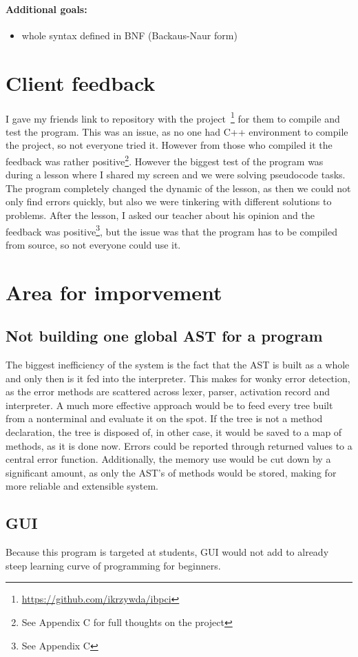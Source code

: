 \documentclass[12pt]{article}
\begin{document}
    \paragraph{Additional goals:}
    \begin{itemize}
        \color{ForestGreen}
        \item whole syntax defined in BNF (Backaus-Naur form)
    \end{itemize}

\section{Client feedback}

    I gave my friends link to repository with the project~\footnote{\url{https://github.com/ikrzywda/ibpci}}
    for them to compile and test the program. This was an issue, as no one had
    C++ environment to compile the project, so not everyone tried it. However
    from those who compiled it the feedback was rather positive\footnote{See Appendix C
    for full thoughts on the project}. However the biggest test of the program
    was during a lesson where I shared my screen and we were solving pseudocode
    tasks. The program completely changed the dynamic of the lesson, as then
    we could not only find errors quickly, but also we were tinkering with different
    solutions to problems. After the lesson, I asked our teacher about his opinion
    and the feedback was positive\footnote{See Appendix C}, but the issue was that
    the program has to be compiled from source, so not everyone could use it.


\section{Area for imporvement}

\subsection{Not building one global AST for a program}
    The biggest inefficiency of the system is the fact that the AST is built as 
    a whole and only then is it fed into the interpreter. This makes for wonky 
    error detection, as the error methods are scattered across lexer, parser, 
    activation record and interpreter. A much more effective approach would be 
    to feed every tree built from a nonterminal and evaluate it on the spot. 
    If the tree is not a method declaration, the tree is disposed of, in other 
    case, it would be saved to a map of methods, as it is done now.
    Errors could be reported through returned values to a central error function. 
    Additionally, the memory use would be cut down by a significant amount, as 
    only the AST's of methods would be stored, making for more reliable and 
    extensible system. 

\subsection{GUI}

    Because this program is targeted at students, GUI would not add to already
    steep learning curve of programming for beginners.
\end{document}
